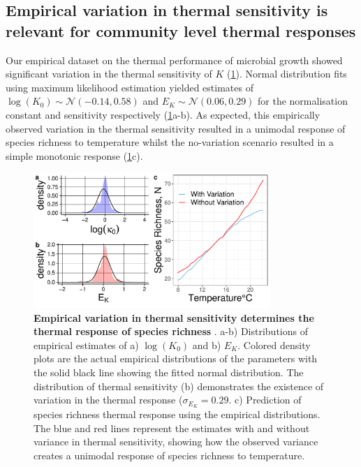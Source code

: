 \documentclass{article}
\begin{document}
\subsection*{Empirical variation in thermal sensitivity is relevant for community level thermal responses}

Our empirical dataset on the thermal performance of microbial growth showed significant variation in the thermal sensitivity of $K$ (\cref{Fig:TPC_data}). Normal distribution fits using maximum likelihood estimation yielded estimates of $\log(K_0) \sim \mathcal{N}(-0.14,0.58)$ and $E_K \sim \mathcal{N}(0.06,0.29)$ for the normalisation constant and sensitivity respectively (\cref{Fig:TPC_data}a-b). As expected, this empirically observed variation in the thermal sensitivity resulted in a unimodal response of species richness to temperature whilst the no-variation scenario resulted in a simple monotonic response (\cref{Fig:TPC_data}c). 

\begin{figure}[h!]
    \centering
    \includegraphics[width = 0.8\textwidth]{docs/Figures/MTE_fig.pdf}
    \caption{\textbf{Empirical variation in thermal sensitivity determines the thermal response of species richness }. a-b) Distributions of empirical estimates of a) $\log(K_0)$ and b) $E_K$. Colored density plots are the actual empirical distributions of the parameters with the solid black line showing the fitted normal distribution. The distribution of thermal sensitivity (b) demonstrates the existence of variation in the thermal response ($\sigma_{E_K} = 0.29$. c) Prediction of species richness thermal response using the empirical distributions. The blue and red lines represent the estimates with and without variance in thermal sensitivity, showing how the observed variance creates a unimodal response of species richness to temperature.}
    \label{Fig:TPC_data}
\end{figure}
\end{document}
